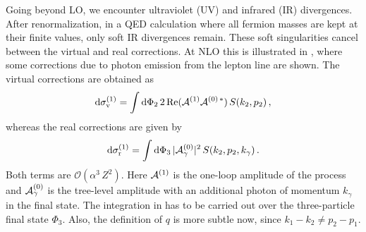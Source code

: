 Going beyond LO, we encounter ultraviolet (UV) and infrared (IR)
divergences. After renormalization, in a QED calculation where all
fermion masses are kept at their finite values, only soft IR
divergences remain. These soft singularities cancel between the
virtual and real corrections. At NLO this is illustrated in
, where some corrections due to photon emission from
the lepton line are shown. The virtual corrections are obtained as
\begin{equation}\label{mcVNLO}
\mathrm{d}\sigma^{(1)}_{\rm v} = \int \mathrm{d}\Phi_2\, 2\operatorname{Re}({\mathcal A}^{(1)}{\mathcal A}^{(0)\,*})\,
S(k_2,p_2)\, ,
\end{equation}
whereas the real corrections are given by 
\begin{equation}\label{eq:mcRNLO}
\mathrm{d}\sigma^{(1)}_{\rm r} = \int \mathrm{d}\Phi_3\, |{\mathcal A}_\gamma^{(0)}|^2\,
S(k_2,p_2,k_\gamma)\, .
\end{equation}
Both terms are $\mathcal{O}(\alpha^3\,Z^2)$. Here ${\mathcal A}^{(1)}$ is the one-loop amplitude of the process  and  ${\mathcal A}_\gamma^{(0)}$
is the tree-level amplitude with an additional photon of momentum
$k_\gamma$ in the final state. The integration in  has
to be carried out over the three-particle final state $\Phi_3$. Also,
the definition of $q$ is more subtle now, since $k_1-k_2\neq p_2-p_1$.





